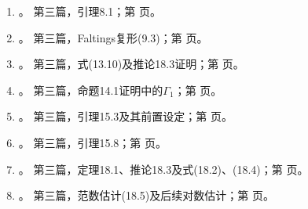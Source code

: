 \begin{enumerate}[label=\arabic*.,leftmargin=2.5em,itemsep=7pt]
第三篇，§7第二阶段的单项式范围；第\,\pageref*{translator-note:21}\,页。
\item \hypertarget{translator-index-22}{}\hyperlink{translator-note-22}{}。
第三篇，引理8.1；第\,\pageref*{translator-note:22}\,页。
\item \hypertarget{translator-index-23}{}\hyperlink{translator-note-23}{}。
第三篇，Faltings复形(9.3)；第\,\pageref*{translator-note:23}\,页。
\item \hypertarget{translator-index-24}{}\hyperlink{translator-note-24}{}。
第三篇，式(13.10)及推论18.3证明；第\,\pageref*{translator-note:24}\,页。
\item \hypertarget{translator-index-25}{}\hyperlink{translator-note-25}{}。
第三篇，命题14.1证明中的$\Gamma_1$；第\,\pageref*{translator-note:25}\,页。
\item \hypertarget{translator-index-26}{}\hyperlink{translator-note-26}{}。
第三篇，引理15.3及其前置设定；第\,\pageref*{translator-note:26}\,页。
\item \hypertarget{translator-index-27}{}\hyperlink{translator-note-27}{}。
第三篇，引理15.8；第\,\pageref*{translator-note:27}\,页。
\item \hypertarget{translator-index-28}{}\hyperlink{translator-note-28}{}。
第三篇，定理18.1、推论18.3及式(18.2)、(18.4)；第\,\pageref*{translator-note:28}\,页。
\item \hypertarget{translator-index-29}{}\hyperlink{translator-note-29}{}。
第三篇，范数估计(18.5)及后续对数估计；第\,\pageref*{translator-note:29}\,页。
\end{enumerate}
